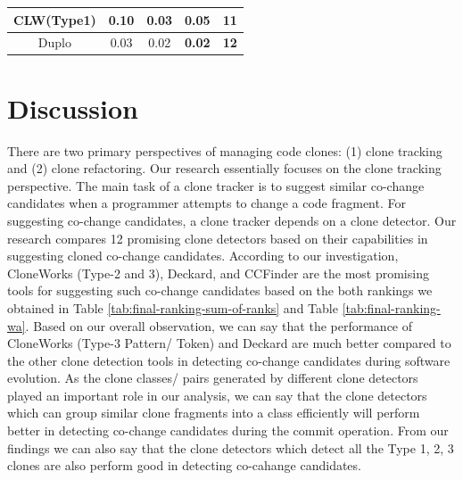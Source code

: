\documentclass[review]{elsarticle}
\begin{document}
\begin{table}[]
\begin{tabular}{|c|c|c|c|c|}
CLW(Type1)                                                          & 0.10                                                                   & 0.03                                                                 & \textbf{0.05}                                                         & \textbf{11}                                                                        \\ \hline
Duplo                                                               & 0.03                                                                   & 0.02                                                                 & \textbf{0.02}                                                         & \textbf{12}                                                                        \\ \hline
\end{tabular}
\end{table}

\vspace{2mm}
\section{Discussion}
\label{the-discussion}
There are two primary perspectives of managing code clones: (1) clone tracking and (2) clone refactoring. Our research essentially focuses on the clone tracking perspective. The main task of a clone tracker is to suggest similar co-change candidates when a programmer attempts to change a code fragment. For suggesting co-change candidates, a clone tracker depends on a clone detector. Our research compares 12 promising clone detectors based on their capabilities in suggesting cloned co-change candidates. According to our investigation, CloneWorks (Type-2 and 3), Deckard, and CCFinder are the most promising tools for suggesting such co-change candidates based on the both rankings we obtained in Table \ref{tab:final-ranking-sum-of-ranks} and Table \ref{tab:final-ranking-wa}. Based on our overall observation, we can say that the performance of CloneWorks (Type-3 Pattern/ Token) and Deckard are much better compared to the other clone detection tools in detecting co-change candidates during software evolution. As the clone classes/ pairs generated by different clone detectors played an important role in our analysis, we can say that the clone detectors which can group similar clone fragments into a class efficiently will perform better in detecting co-change candidates during the commit operation. From our findings we can also say that the clone detectors which detect all the Type 1, 2, 3 clones are also perform good in detecting co-cahange candidates. 
\end{document}
